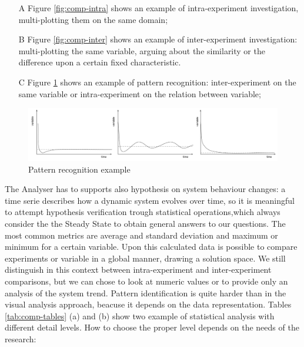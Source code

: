 \begin{enumerate}
\item[A] Figure \ref{fig:comp-intra} shows an example of intra-experiment investigation, multi-plotting them on the same domain; 
\item[B] Figure \ref{fig:comp-inter} shows an example of inter-experiment investigation: multi-plotting the same variable, arguing about the similarity or the difference upon a certain fixed characteristic.  
\item[C] Figure \ref{fig:patterns}  shows an example of pattern recognition: inter-experiment on the same variable or intra-experiment on the relation between variable;
\end{enumerate}

\begin{figure}[tbh]
  \centering
	\includegraphics[width=0.85\linewidth]{images/patterns}
	\caption{Pattern recognition example} 
  	\label{fig:patterns}
\end{figure}

\pagebreak

The Analyser has to supports also hypothesis on system behaviour changes: a time serie describes how a dynamic system evolves over time, so it is meaningful to attempt hypothesis verification trough statistical operations,which always consider the the Steady State to obtain general answers to our questions. The most common metrics are average and standard deviation and maximum or minimum for a certain variable. Upon this calculated data is possible to compare experiments or variable in a global manner, drawing a solution space. We still distinguish in this context between intra-experiment and inter-experiment comparisons, but we can chose to look at numeric values or to provide only an analysis of the system trend. Pattern identification is quite harder than in the visual analysis approach, beacuse it depends on the data representation. Tables \ref{tab:comp-tables} (a) and (b) show two example of statistical analysis with different detail levels. How to choose the proper level depends on the needs of the research:

